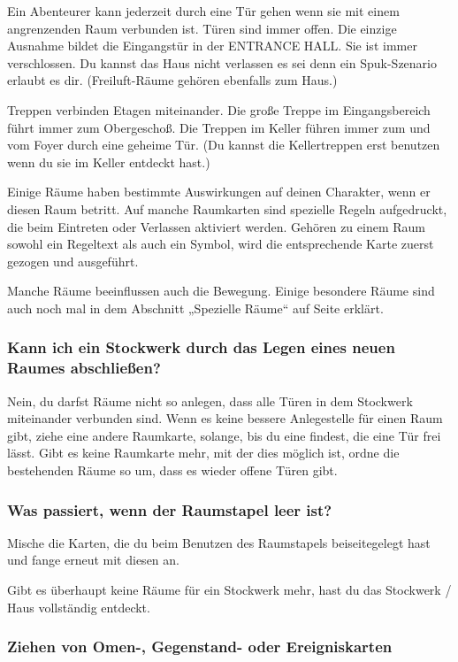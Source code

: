 Ein Abenteurer kann jederzeit durch eine Tür gehen wenn sie mit einem angrenzenden Raum verbunden ist. Türen sind immer offen. Die einzige Ausnahme bildet die Eingangstür in der ENTRANCE HALL. Sie ist immer verschlossen. Du kannst das Haus nicht verlassen es sei denn ein Spuk-Szenario erlaubt es dir. (Freiluft-Räume gehören ebenfalls zum Haus.)

Treppen verbinden Etagen miteinander. Die große Treppe im Eingangsbereich führt immer zum Obergeschoß. Die Treppen im Keller führen immer zum und vom Foyer durch eine geheime Tür. (Du kannst die Kellertreppen erst benutzen wenn du sie im Keller entdeckt
hast.)

Einige Räume haben bestimmte Auswirkungen auf deinen Charakter, wenn er diesen Raum betritt. Auf manche Raumkarten sind spezielle Regeln aufgedruckt, die beim Eintreten oder Verlassen aktiviert werden. Gehören zu einem Raum sowohl ein Regeltext als auch ein Symbol, wird die entsprechende Karte zuerst gezogen und ausgeführt.

Manche Räume beeinflussen auch die Bewegung. Einige besondere Räume sind auch noch mal in dem Abschnitt „Spezielle Räume“ auf Seite \pageref{kap:rules:specialrooms} erklärt.


\subsubsection{Kann ich ein Stockwerk durch das Legen eines neuen Raumes abschließen?}

Nein, du darfst Räume nicht so anlegen, dass alle Türen in dem Stockwerk miteinander verbunden sind. Wenn es keine bessere Anlegestelle für einen Raum gibt, ziehe eine andere Raumkarte, solange, bis du eine findest, die eine Tür frei lässt. Gibt es keine Raumkarte mehr, mit der dies möglich ist, ordne die bestehenden Räume so um, dass es wieder offene Türen gibt.

\subsubsection{Was passiert, wenn der Raumstapel leer ist?}

Mische die Karten, die du beim Benutzen des Raumstapels beiseitegelegt hast und fange erneut mit diesen an.

Gibt es überhaupt keine Räume für ein Stockwerk mehr, hast du das Stockwerk / Haus vollständig entdeckt.

\subsubsection{Ziehen von Omen-, Gegenstand- oder Ereigniskarten}

